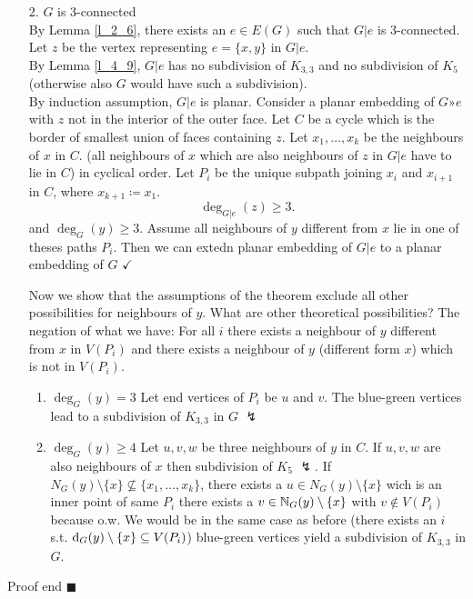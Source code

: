 \documentclass[aagt.tex]{subfiles}
\begin{document}

\begin{enumerate}
  \item[2.] $G$ is 3-connected\\
  By Lemma \ref{l_2_6}, there exists an $e \in E(G)$ such that $G|e$ is 3-connected. Let $z$ be the vertex representing $e = \{x,y\}$ in $G|e$.
  \\
  By Lemma \ref{l_4_9}, $G|e$ has no subdivision of $K_{3,3}$ and no subdivision of $K_5$ (otherwise also $G$ would have such a subdivision).
  \\
  By induction assumption, $G|e$ is planar. Consider a planar embedding of $G»e$ with $z$ not in the interior of the outer face.
  Let $C$ be a cycle which is the border of smallest union of faces containing $z$.
  Let $x_1,\dots,x_k$ be the neighbours of $x$ in $C$. (all neighbours of $x$ which are also neighbours of $z$ in $G|e$ have to lie in $C$) in cyclical order.
  Let $P_i$ be the unique subpath joining $x_i$ and $x_{i+1}$ in $C$, where $x_{k+1} \coloneqq x_1$.
  \[ \deg_{G|e}(z) \geq 3 \text{.} \]
  and $\deg_G(y) \geq 3$.
  Assume all neighbours of $y$ different from $x$ lie in one of theses paths $P_i$.
  Then we can extedn planar embedding of $G|e$ to a planar embedding of $G$ $\checkmark$
  
  Now we show that the assumptions of the theorem exclude all other possibilities for neighbours of $y$.
  What are other theoretical possibilities?
  The negation of what we have:
  For all $i$ there exists a neighbour of $y$ different from $x$ in $V(P_i)$ and there exists a neighbour of $y$ (different form $x$) which is not in $V(P_i)$.
  \begin{enumerate}
    \item $\deg_G(y) = 3$ 
    Let end vertices of $P_i$ be $u$ and $v$.
    The blue-green vertices lead to a subdivision of $K_{3,3}$ in $G$ $\lightning$
    \item $\deg_G(y) \geq 4$ 
    Let $u,v,w$ be three neighbours of $y$ in $C$.
    If $u,v,w$ are also neighbours of $x$ then subdivision of $K_5$ $\lightning$. 
    If $N_G(y) \setminus \{x\} \nsubseteq \{x_1,\dots,x_k\}$,
    there exists a $u \in N_G(y) \setminus \{x\}$ wich is an inner point of same $P_i$
    there exists a $v \in \mathbb{N}_G(y) \setminus \{x\}$ with $v \notin V(P_i)$ because o.w. We would be in the same case as before (there exists an $i$ s.t. $\operatorname{d}_G(y) \setminus \{x\} \subseteq V(P_i)$)
    blue-green vertices yield a subdivision of $K_{3,3}$ in $G$.
  \end{enumerate}
\end{enumerate}
Proof end $\blacksquare$
\end{document}
